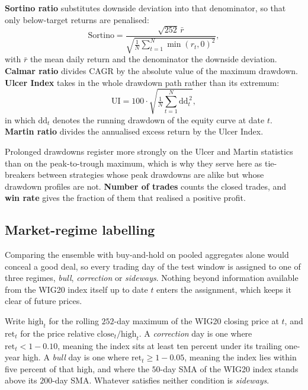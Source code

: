 \textbf{Sortino ratio} \cite{sortino1994} substitutes downside deviation into that denominator, so that only below-target returns are penalised:
\begin{equation}
\mathrm{Sortino} = \frac{\sqrt{252}\,\bar{r}}{\sqrt{\tfrac{1}{N}\sum_{t=1}^{N}\min(r_t, 0)^2}},
\label{eq:sortino}
\end{equation}
with $\bar{r}$ the mean daily return and the denominator the downside deviation. \textbf{Calmar ratio} \cite{young1991} divides CAGR by the absolute value of the maximum drawdown. \textbf{Ulcer Index} \cite{martin1989} takes in the whole drawdown path rather than its extremum:
\begin{equation}
\mathrm{UI} = 100 \cdot \sqrt{\tfrac{1}{N}\sum_{t=1}^{N} \mathrm{dd}_t^{\,2}},
\label{eq:ulcer}
\end{equation}
in which $\mathrm{dd}_t$ denotes the running drawdown of the equity curve at date $t$. \textbf{Martin ratio} \cite{martin1989} divides the annualised excess return by the Ulcer Index.

Prolonged drawdowns register more strongly on the Ulcer and Martin statistics than on the peak-to-trough maximum, which is why they serve here as tie-breakers between strategies whose peak drawdowns are alike but whose drawdown profiles are not. \textbf{Number of trades} counts the closed trades, and \textbf{win rate} gives the fraction of them that realised a positive profit.

\subsection{Market-regime labelling}\label{subsec:regimes}

Comparing the ensemble with buy-and-hold on pooled aggregates alone would conceal a good deal, so every trading day of the test window is assigned to one of three regimes, \emph{bull}, \emph{correction} or \emph{sideways}. Nothing beyond information available from the WIG20 index itself up to date $t$ enters the assignment, which keeps it clear of future prices.

Write $\mathrm{high}_t$ for the rolling $252$-day maximum of the WIG20 closing price at $t$, and $\mathrm{ret}_t$ for the price relative $\mathrm{close}_t / \mathrm{high}_t$. A \emph{correction} day is one where $\mathrm{ret}_t < 1 - 0.10$, meaning the index sits at least ten percent under its trailing one-year high. A \emph{bull} day is one where $\mathrm{ret}_t \geq 1 - 0.05$, meaning the index lies within five percent of that high, and where the $50$-day SMA of the WIG20 index stands above its $200$-day SMA. Whatever satisfies neither condition is \emph{sideways}.

